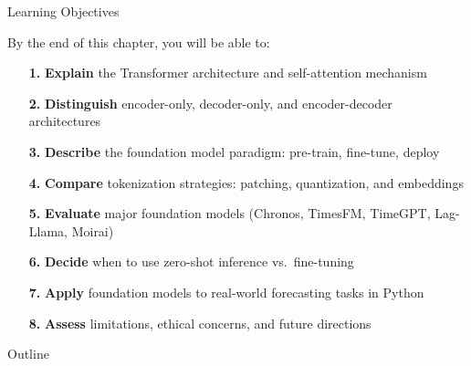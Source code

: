 \documentclass[9pt, aspectratio=169, t]{beamer}
\subtitle{Chapter 11: LLMs and Foundation Models for Time Series}
\begin{document}
{
\begin{frame}
    \titlepage
\end{frame}
}

\begin{frame}{Learning Objectives}
    \begin{cminipage}{0.95\textwidth}
    \begin{block}{By the end of this chapter, you will be able to:}
        \begin{itemize}\setlength{\itemsep}{2pt}
            \item[\textcolor{MainBlue}{\textbf{1.}}] \textbf{Explain} the Transformer architecture and self-attention mechanism
            \item[\textcolor{MainBlue}{\textbf{2.}}] \textbf{Distinguish} encoder-only, decoder-only, and encoder-decoder architectures
            \item[\textcolor{MainBlue}{\textbf{3.}}] \textbf{Describe} the foundation model paradigm: pre-train, fine-tune, deploy
            \item[\textcolor{MainBlue}{\textbf{4.}}] \textbf{Compare} tokenization strategies: patching, quantization, and embeddings
            \item[\textcolor{MainBlue}{\textbf{5.}}] \textbf{Evaluate} major foundation models (Chronos, TimesFM, TimeGPT, Lag-Llama, Moirai)
            \item[\textcolor{MainBlue}{\textbf{6.}}] \textbf{Decide} when to use zero-shot inference vs.\ fine-tuning
            \item[\textcolor{MainBlue}{\textbf{7.}}] \textbf{Apply} foundation models to real-world forecasting tasks in Python
            \item[\textcolor{MainBlue}{\textbf{8.}}] \textbf{Assess} limitations, ethical concerns, and future directions
        \end{itemize}
    \end{block}
    \end{cminipage}
\end{frame}

\begin{frame}{Outline}
    \vspace{-0.3cm}
    {\small
    \tableofcontents
    }
\end{frame}
\end{document}
